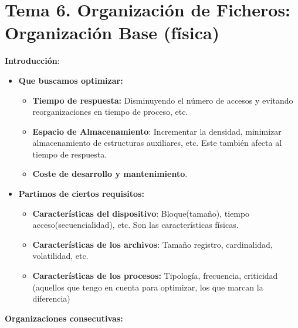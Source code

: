 \documentclass[12pt, twoside, openright]{report} %
\begin{document}
  
\chapter{Tema 6. Organización de Ficheros: Organización Base (física)}



  
  \textbf{Introducción}:
  

  \begin{itemize}
  \item \textbf{Que buscamos optimizar:}
    

    \begin{itemize}
    \item \textbf{Tiempo de respuesta:} Disminuyendo el número de accesos y
      evitando reorganizaciones en tiempo de proceso, etc.
      
    \item \textbf{Espacio de Almacenamiento}: Incrementar la densidad,
      minimizar almacenamiento de estructuras auxiliares, etc. Este
      también afecta al tiempo de respuesta.
      
    \item \textbf{Coste de desarrollo y mantenimiento}.
      
    \end{itemize}
  \item \textbf{Partimos de ciertos requisitos:}
    

    \begin{itemize}
    \item \textbf{Características del dispositivo}: Bloque(tamaño), tiempo
      acceso(secuencialidad), etc. Son las características físicas.
      
    \item \textbf{Características de los archivos}: Tamaño registro,
      cardinalidad, volatilidad, etc.
      
    \item \textbf{Características de los procesos:} Tipología, frecuencia,
      criticidad (aquellos que tengo en cuenta para optimizar, los que
      marcan la diferencia)
      
    \end{itemize}
  \end{itemize}

  
  \textbf{Organizaciones consecutivas:}
  
\end{document}
